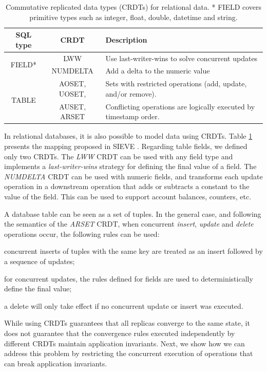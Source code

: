 \documentclass[11pt,dvipdfm]{article}
\begin{document}
\begin{table}[t!]
\small
\centering
\begin{tabular}{|c|c|p{9.3cm}|}
\hline
SQL type & CRDT & Description \\
\hline
\hline
\multirow{2}{*}{FIELD*} & LWW &  Use last-writer-wins to solve concurrent updates\\\cline{2-3}
 & NUMDELTA  &  Add a delta to the numeric value \\\hline
\multirow{2}{*}{TABLE} & AOSET,                       UOSET,       & Sets with restricted operations (add, update, and/or remove). \\
& AUSET,              ARSET & Conflicting operations are logically executed by timestamp order.\\
\hline
\end{tabular}
\caption{Commutative replicated data types (CRDTs) for relational data. *
FIELD covers primitive types such as integer, float, double, datetime and string.}
\label{tab:crdts}
\end{table}

In relational databases, it is also possible to model data using CRDTs.
Table \ref{tab:crdts} presents the mapping proposed in SIEVE \cite{Li14Automating}.
Regarding table fields, we defined only two CRDTs. The \emph{LWW} CRDT can be
used with any field type and implements a \emph{last-writer-wins} strategy
for defining the final value of a field.
The \emph{NUMDELTA} CRDT can be used with numeric fields, and transforms each
update operation in a downstream operation that adds or subtracts
a constant to the value of the field.
This can be used to support account balances,
counters, etc.

A database table can be seen as a set of tuples.
In the general case, and following the semantics of the \emph{ARSET} CRDT, when concurrent
\emph{insert}, \emph{update} and \emph{delete} operations occur,
the following rules can be used:
\begin{inparaenum}[(1)]
\item concurrent inserts of tuples with the same key are treated as an insert followed
by a sequence of updates;
\item for concurrent updates, the rules defined for fields
are used to deterministically define the final value;
\item a delete will only take effect if no concurrent update or insert was executed.
\end{inparaenum}

While using CRDTs guarantees that all replicas converge to the same state, it does
not guarantee that the convergence rules executed independently by different CRDTs
maintain application invariants. Next, we show how we can address
this problem by restricting the concurrent execution of operations that can break
application invariants.
\end{document}
